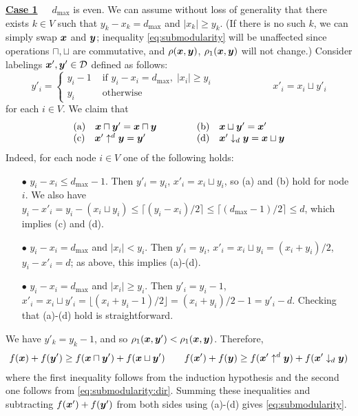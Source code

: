 \documentclass[11pt,onecolumn]{article}
\newcommand{\myparagraph}[1]{{\vspace*{2pt}\noindent\bf{#1}~~}}
\def\D{{\cal D}}
\newcommand{\bx}{\mbox{\boldmath $x$}}
\newcommand{\by}{\mbox{\boldmath $y$}}
\begin{document}
\myparagraph{\underline{Case 1}} $d_{\max}$ is even.
We can assume without loss of generality that there exists $k\in V$ such that $y_k-x_k=d_{\max}$ and
$|x_k|\ge y_k$.
(If there is no such $k$, we can simply swap $\bx$ and $\by$; inequality \eqref{eq:submodularity}
will be unaffected since operations $\sqcap,\sqcup$ are commutative, and $\rho(\bx,\by)$, $\rho_1(\bx,\by)$ will not change.)
Consider labelings $\bx',\by'\in\D$ defined as follows:
\begin{equation*}
y'_i  =  \begin{cases}
y_i-1 & \mbox{ if~} y_i-x_i=d_{\max}, \; |x_i| \ge y_i \\
y_i   & \mbox{ otherwise}
\end{cases}
 \qquad\qquad\qquad
x'_i  =  x_i \sqcup y'_i
\end{equation*}
for each $i\in V$. We claim that
\begin{equation*}
\begin{tabular}{ll}
(a)$\quad \bx \sqcap \by' = \bx \sqcap \by \qquad \quad  $ &
(b)$\quad \bx \sqcup \by' = \bx' $ \\
(c)$\quad \bx' \uparrow^{d} \by =  \by' $ &
(d)$\quad \bx' \downarrow_{d} \by = \bx \sqcup \by$
\end{tabular}
\end{equation*}
Indeed, for each node $i\in V$ one of the following holds:
\begin{itemize}
\item[$\bullet$] $y_i-x_i\le d_{\max}-1$. Then $y'_i=y_i$, $x'_i=x_i \sqcup y_i$, so (a) and (b) hold for node $i$.
We also have $y_i - x'_i = y_i - (x_i\sqcup y_i) \le \lceil (y_i - x_i)/2 \rceil \le \lceil (d_{\max}-1)/2 \rceil \le d$,
which implies (c) and (d). 
\item[$\bullet$] $y_i-x_i=d_{\max}$ and $|x_i|<y_i$. Then $y'_i=y_i$, $x'_i=x_i \sqcup y_i=(x_i+y_i)/2$, 
$y_i - x'_i = d$; as above, this implies (a)-(d). 
\item[$\bullet$] $y_i-x_i=d_{\max}$ and $|x_i|\ge y_i$. Then $y'_i=y_i-1$, $x'_i = x_i \sqcup y'_i = \lfloor(x_i+y_i-1)/2\rfloor=(x_i+y_i)/2-1=y'_i-d$.
Checking that (a)-(d) hold is straightforward.
\end{itemize}
We have $y'_k=y_k-1$, and so $\rho_1(\bx,\by')<\rho_1(\bx,\by)$. Therefore, 
\begin{eqnarray*}
f(\bx)+f(\by') \ge  f(\bx \sqcap \by') + f(\bx \sqcup \by') & \quad &
f(\bx')+f(\by) \ge  f(\bx' \uparrow^{d} \by) + f(\bx' \downarrow_{d} \by)
\end{eqnarray*}
where the first inequality follows from the induction hypothesis and the second one follows from \eqref{eq:submodularity:dir}.
Summing these inequalities and subtracting $f(\bx')+f(\by')$ from both sides using (a)-(d) gives \eqref{eq:submodularity}.
\end{document}
